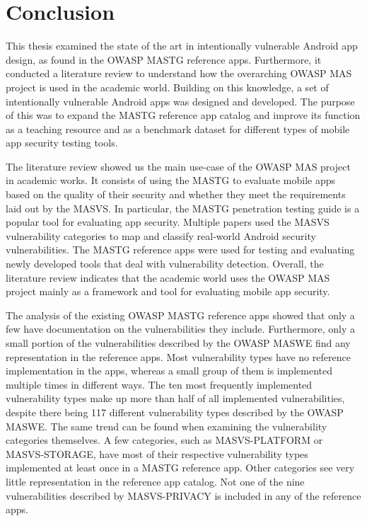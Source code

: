 \chapter{Conclusion}
\label{c:conclusion}

This thesis examined the state of the art in intentionally vulnerable Android app design, as found in the OWASP MASTG reference apps. Furthermore, it conducted a literature review to understand how the overarching OWASP MAS project is used in the academic world. Building on this knowledge, a set of intentionally vulnerable Android apps was designed and developed. The purpose of this was to expand the MASTG reference app catalog and improve its function as a teaching resource and as a benchmark dataset for different types of mobile app security testing tools. 

The literature review showed us the main use-case of the OWASP MAS project in academic works. It consists of using the MASTG to evaluate mobile apps based on the quality of their security and whether they meet the requirements laid out by the MASVS. In particular, the MASTG penetration testing guide is a popular tool for evaluating app security. Multiple papers used the MASVS vulnerability categories to map and classify real-world Android security vulnerabilities. The MASTG reference apps were used for testing and evaluating newly developed tools that deal with vulnerability detection. Overall, the literature review indicates that the academic world uses the OWASP MAS project mainly as a framework and tool for evaluating mobile app security.

The analysis of the existing OWASP MASTG reference apps showed that only a few have documentation on the vulnerabilities they include. Furthermore, only a small portion of the vulnerabilities described by the OWASP MASWE find any representation in the reference apps. Most vulnerability types have no reference implementation in the apps, whereas a small group of them is implemented multiple times in different ways. The ten most frequently implemented vulnerability types make up more than half of all implemented vulnerabilities, despite there being 117 different vulnerability types described by the OWASP MASWE. The same trend can be found when examining the vulnerability categories themselves. A few categories, such as MASVS-PLATFORM or MASVS-STORAGE, have most of their respective vulnerability types implemented at least once in a MASTG reference app. Other categories see very little representation in the reference app catalog. Not one of the nine vulnerabilities described by MASVS-PRIVACY is included in any of the reference apps.

